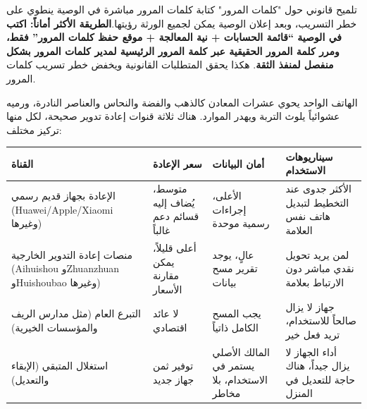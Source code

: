 \begin{tcbwarn}{تلميح قانوني حول "كلمات المرور"}
كتابة كلمات المرور مباشرة في الوصية ينطوي على خطر التسريب، وبعد إعلان الوصية يمكن لجميع الورثة رؤيتها.\textbf{الطريقة الأكثر أماناً: اكتب في الوصية “قائمة الحسابات + نية المعالجة + موقع حفظ كلمات المرور” فقط، ومرر كلمة المرور الحقيقية عبر كلمة المرور الرئيسية لمدير كلمات المرور بشكل منفصل لمنفذ الثقة}. هكذا يحقق المتطلبات القانونية ويخفض خطر تسريب كلمات المرور.

\end{tcbwarn}


الهاتف الواحد يحوي عشرات المعادن كالذهب والفضة والنحاس والعناصر النادرة، ورميه عشوائياً يلوث التربة ويهدر الموارد. هناك ثلاثة قنوات إعادة تدوير صحيحة، لكل منها تركيز مختلف:

\begin{center}
\begin{tabularx}{\linewidth}{|X|X|X|X|}
\hline
\textbf{القناة} & \textbf{سعر الإعادة} & \textbf{أمان البيانات} & \textbf{سيناريوهات الاستخدام} \tabularnewline
\hline
الإعادة بجهاز قديم رسمي (Huawei/Apple/Xiaomi وغيرها) & متوسط، يُضاف إليه قسائم دعم غالباً & الأعلى، إجراءات رسمية موحدة & الأكثر جدوى عند التخطيط لتبديل هاتف نفس العلامة \tabularnewline
منصات إعادة التدوير الخارجية (Aihuishou وZhuanzhuan وHuishoubao وغيرها) & أعلى قليلاً، يمكن مقارنة الأسعار & عالٍ، يوجد تقرير مسح بيانات & لمن يريد تحويل نقدي مباشر دون الارتباط بعلامة \tabularnewline
التبرع العام (مثل مدارس الريف والمؤسسات الخيرية) & لا عائد اقتصادي & يجب المسح الكامل ذاتياً & جهاز لا يزال صالحاً للاستخدام، تريد فعل خير \tabularnewline
استغلال المتبقي (الإبقاء والتعديل) & توفير ثمن جهاز جديد & المالك الأصلي يستمر في الاستخدام، بلا مخاطر & أداء الجهاز لا يزال جيداً، هناك حاجة للتعديل في المنزل \tabularnewline
\hline
\end{tabularx}
\end{center}

